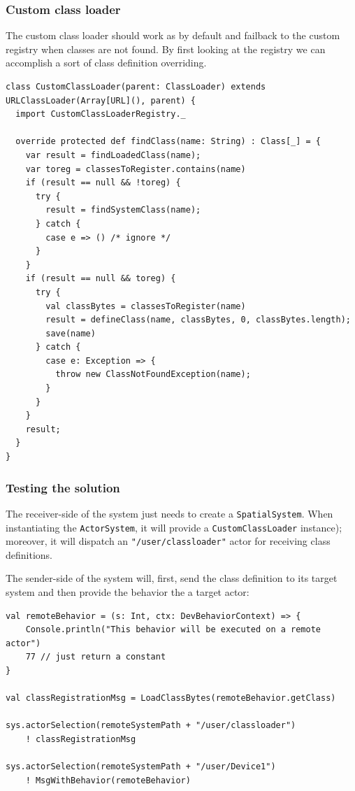 \documentclass[11pt]{llncs}
\begin{document}
\subsubsection{Custom class loader}

The custom class loader should work as by default and failback
  to the custom registry when classes are not found.
  By first looking at the registry we can accomplish a sort of class definition overriding.

\begin{lstlisting}
class CustomClassLoader(parent: ClassLoader) extends URLClassLoader(Array[URL](), parent) {
  import CustomClassLoaderRegistry._
  
  override protected def findClass(name: String) : Class[_] = {
    var result = findLoadedClass(name);
    var toreg = classesToRegister.contains(name)
    if (result == null && !toreg) {
      try {
        result = findSystemClass(name);
      } catch {
        case e => () /* ignore */
      }
    }
    if (result == null && toreg) {
      try {
        val classBytes = classesToRegister(name)
        result = defineClass(name, classBytes, 0, classBytes.length);
        save(name)
      } catch {
        case e: Exception => {
          throw new ClassNotFoundException(name);
        }
      }
    }
    result;
  }
}
\end{lstlisting}


\subsubsection{Testing the solution}

The receiver-side of the system just needs to create a \texttt{SpatialSystem}. When instantiating the \texttt{ActorSystem}, it will provide a \texttt{CustomClassLoader} instance); moreover, it will dispatch an \texttt{"/user/classloader"} actor for receiving class definitions.

The sender-side of the system will, first, send the class definition to its target system and then provide the behavior the a target actor:

\begin{lstlisting}
val remoteBehavior = (s: Int, ctx: DevBehaviorContext) => {
    Console.println("This behavior will be executed on a remote actor")
    77 // just return a constant
}

val classRegistrationMsg = LoadClassBytes(remoteBehavior.getClass)

sys.actorSelection(remoteSystemPath + "/user/classloader") 
    ! classRegistrationMsg

sys.actorSelection(remoteSystemPath + "/user/Device1") 
    ! MsgWithBehavior(remoteBehavior)
\end{lstlisting}
\end{document}

